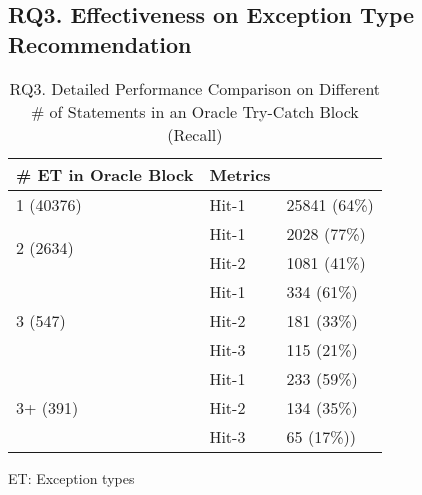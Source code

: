 \subsection{RQ3. Effectiveness on Exception Type Recommendation}
\label{sec:rq3}


\begin{table}[t]
	\caption{RQ3. Detailed Performance Comparison on Different \# of Statements in an Oracle Try-Catch Block (Recall)}
	\tabcolsep 2pt
	{\small
		\begin{center}
			\renewcommand{\arraystretch}{1}
			\begin{tabular}{p{3.5cm}<{\centering}|p{2cm}<{\centering}|p{2.5cm}<{\centering}}
				\hline
				\# ET in Oracle Block& Metrics& {\textsc{\tool}\xspace} \\
				\hline
				\multirow{1}{*}{1 (40376)}   & Hit-1  & 25841 (64\%) \\
				\hline
				\multirow{2}{*}{2 (2634)}  & Hit-1   & 2028 (77\%) \\
				& Hit-2         &  1081 (41\%) \\
				\hline
				\multirow{3}{*}{3 (547)}  & Hit-1    & 334 (61\%) \\
				& Hit-2     & 181 (33\%)\\
				& Hit-3     & 115 (21\%) \\
				\hline
				\multirow{4}{*}{3+ (391)}  & Hit-1   & 233 (59\%) \\
				& Hit-2     & 134 (35\%) \\
				& Hit-3     & 65 (17\%))\\
				\hline
			\end{tabular}		
		ET: Exception types
			\label{RQ3_results_1}
		\end{center}
	}
\end{table}

{\color{red}{1. Our model do well on hit-1 condition which means in most cases, our model can at least predict one exception type correctly for a try-catch block. 2. Results show that the more exception types one try-catch block has, our model is harder to predict all of them correctly. }}


